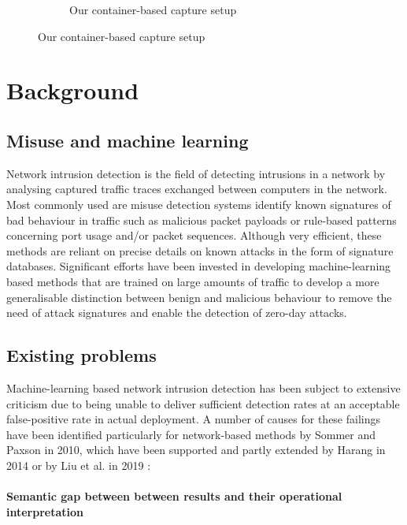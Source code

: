\documentclass{article}
\begin{document}
\begin{figure}
\begin{subfigure}[b]{0.48\textwidth}
\caption{Our container-based capture setup}
\end{subfigure}
\end{figure}


\section{Background}

\subsection{Misuse and machine learning}


Network intrusion detection is the field of detecting intrusions in a network by analysing captured traffic traces exchanged between computers in the network. Most commonly used are misuse detection systems identify known signatures of bad behaviour in traffic such as malicious packet payloads or rule-based patterns concerning port usage and/or packet sequences. Although very efficient, these methods are reliant on precise details on known attacks in the form of signature databases. Significant efforts have been invested in developing machine-learning based methods that are trained on large amounts of traffic to develop a more generalisable distinction between benign and malicious behaviour to remove the need of attack signatures and enable the detection of zero-day attacks.


\subsection{Existing problems}

Machine-learning based network intrusion detection has been subject to extensive criticism due to being unable to deliver sufficient detection rates at an acceptable false-positive rate in actual deployment. A number of causes for these failings have been identified particularly for network-based methods by Sommer and Paxson \cite{sommer2010outside} in 2010, which have been supported and partly extended by Harang \cite{harang2014bridging} in 2014 or by Liu et al. in 2019 \cite{liu2019machine}:


\paragraph{Semantic gap between between results and their operational interpretation}
\end{document}
